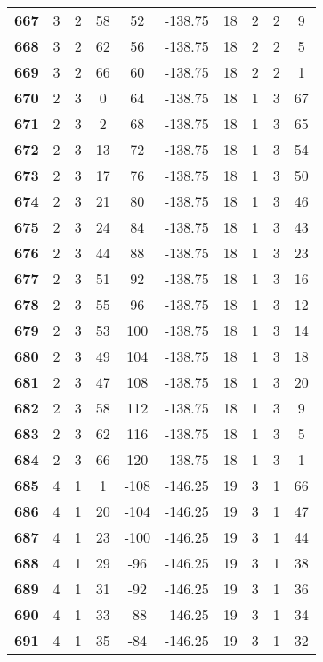\documentclass[12pt,letterpaper, onecolumn]{exam}
\begin{document}
\begin{longtable}{cccccccccc}
    \textbf{667} & 3 & 2 & 58 & 52 & -138.75 & 18 & 2 & 2 & 9 \\ 
    \textbf{668} & 3 & 2 & 62 & 56 & -138.75 & 18 & 2 & 2 & 5 \\ 
    \textbf{669} & 3 & 2 & 66 & 60 & -138.75 & 18 & 2 & 2 & 1 \\ 
    \textbf{670} & 2 & 3 & 0 & 64 & -138.75 & 18 & 1 & 3 & 67 \\ 
    \textbf{671} & 2 & 3 & 2 & 68 & -138.75 & 18 & 1 & 3 & 65 \\ 
    \textbf{672} & 2 & 3 & 13 & 72 & -138.75 & 18 & 1 & 3 & 54 \\ 
    \textbf{673} & 2 & 3 & 17 & 76 & -138.75 & 18 & 1 & 3 & 50 \\ 
    \textbf{674} & 2 & 3 & 21 & 80 & -138.75 & 18 & 1 & 3 & 46 \\ 
    \textbf{675} & 2 & 3 & 24 & 84 & -138.75 & 18 & 1 & 3 & 43 \\ 
    \textbf{676} & 2 & 3 & 44 & 88 & -138.75 & 18 & 1 & 3 & 23 \\ 
    \textbf{677} & 2 & 3 & 51 & 92 & -138.75 & 18 & 1 & 3 & 16 \\ 
    \textbf{678} & 2 & 3 & 55 & 96 & -138.75 & 18 & 1 & 3 & 12 \\ 
    \textbf{679} & 2 & 3 & 53 & 100 & -138.75 & 18 & 1 & 3 & 14 \\ 
    \textbf{680} & 2 & 3 & 49 & 104 & -138.75 & 18 & 1 & 3 & 18 \\ 
    \textbf{681} & 2 & 3 & 47 & 108 & -138.75 & 18 & 1 & 3 & 20 \\ 
    \textbf{682} & 2 & 3 & 58 & 112 & -138.75 & 18 & 1 & 3 & 9 \\ 
    \textbf{683} & 2 & 3 & 62 & 116 & -138.75 & 18 & 1 & 3 & 5 \\ 
    \textbf{684} & 2 & 3 & 66 & 120 & -138.75 & 18 & 1 & 3 & 1 \\ 
    \textbf{685} & 4 & 1 & 1 & -108 & -146.25 & 19 & 3 & 1 & 66 \\ 
    \textbf{686} & 4 & 1 & 20 & -104 & -146.25 & 19 & 3 & 1 & 47 \\ 
    \textbf{687} & 4 & 1 & 23 & -100 & -146.25 & 19 & 3 & 1 & 44 \\ 
    \textbf{688} & 4 & 1 & 29 & -96 & -146.25 & 19 & 3 & 1 & 38 \\       \hline
    \textbf{689} & 4 & 1 & 31 & -92 & -146.25 & 19 & 3 & 1 & 36 \\
    \textbf{690} & 4 & 1 & 33 & -88 & -146.25 & 19 & 3 & 1 & 34 \\ 
    \textbf{691} & 4 & 1 & 35 & -84 & -146.25 & 19 & 3 & 1 & 32 \\ 

\end{longtable}
\end{document}
